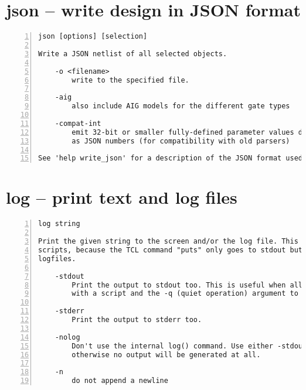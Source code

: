 \section{json -- write design in JSON format}
\label{cmd:json}
\begin{lstlisting}[numbers=left,frame=single]
    json [options] [selection]

Write a JSON netlist of all selected objects.

    -o <filename>
        write to the specified file.

    -aig
        also include AIG models for the different gate types

    -compat-int
        emit 32-bit or smaller fully-defined parameter values directly
        as JSON numbers (for compatibility with old parsers)

See 'help write_json' for a description of the JSON format used.
\end{lstlisting}

\section{log -- print text and log files}
\label{cmd:log}
\begin{lstlisting}[numbers=left,frame=single]
    log string

Print the given string to the screen and/or the log file. This is useful for TCL
scripts, because the TCL command "puts" only goes to stdout but not to
logfiles.

    -stdout
        Print the output to stdout too. This is useful when all Yosys is executed
        with a script and the -q (quiet operation) argument to notify the user.

    -stderr
        Print the output to stderr too.

    -nolog
        Don't use the internal log() command. Use either -stdout or -stderr,
        otherwise no output will be generated at all.

    -n
        do not append a newline
\end{lstlisting}

